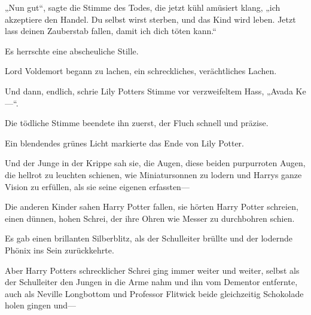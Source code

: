 \begin{em}
„Nun gut“, sagte die Stimme des Todes, die jetzt kühl amüsiert klang, „ich akzeptiere den Handel. Du selbst wirst sterben, und das Kind wird leben. Jetzt lass deinen Zauberstab fallen, damit ich dich töten kann.“

Es herrschte eine abscheuliche Stille.

Lord Voldemort begann zu lachen, ein schreckliches, verächtliches Lachen.

Und dann, endlich, schrie Lily Potters Stimme vor verzweifeltem Hass, „Avada Ke—“.

Die tödliche Stimme beendete ihn zuerst, der Fluch schnell und präzise.


Ein blendendes grünes Licht markierte das Ende von Lily Potter.

Und der Junge in der Krippe sah sie, die Augen, diese beiden purpurroten Augen, die hellrot zu leuchten schienen, wie Miniatursonnen zu lodern und Harrys ganze Vision zu erfüllen, als sie seine eigenen erfassten—
\end{em}

\later

Die anderen Kinder sahen Harry Potter fallen, sie hörten Harry Potter schreien, einen dünnen, hohen Schrei, der ihre Ohren wie Messer zu durchbohren schien.

Es gab einen brillanten Silberblitz, als der Schulleiter  brüllte und der lodernde Phönix ins Sein zurückkehrte.

Aber Harry Potters schrecklicher Schrei ging immer weiter und weiter, selbst als der Schulleiter den Jungen in die Arme nahm und ihn vom Dementor entfernte, auch als Neville Longbottom und Professor Flitwick beide gleichzeitig Schokolade holen gingen und—

